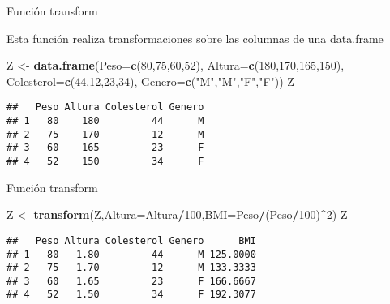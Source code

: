 \documentclass[ignorenonframetext,]{beamer}
\newenvironment{Shaded}{\begin{snugshade}}{\end{snugshade}}
\newcommand{\KeywordTok}[1]{\textcolor[rgb]{0.13,0.29,0.53}{\textbf{#1}}}
\newcommand{\DataTypeTok}[1]{\textcolor[rgb]{0.13,0.29,0.53}{#1}}
\newcommand{\DecValTok}[1]{\textcolor[rgb]{0.00,0.00,0.81}{#1}}
\newcommand{\StringTok}[1]{\textcolor[rgb]{0.31,0.60,0.02}{#1}}
\newcommand{\OperatorTok}[1]{\textcolor[rgb]{0.81,0.36,0.00}{\textbf{#1}}}
\newcommand{\NormalTok}[1]{#1}
\begin{document}
\begin{frame}[fragile]{Función transform}

Esta función realiza transformaciones sobre las columnas de una
data.frame

\begin{Shaded}
\begin{Highlighting}[]
\NormalTok{Z <-}\StringTok{ }\KeywordTok{data.frame}\NormalTok{(}\DataTypeTok{Peso=}\KeywordTok{c}\NormalTok{(}\DecValTok{80}\NormalTok{,}\DecValTok{75}\NormalTok{,}\DecValTok{60}\NormalTok{,}\DecValTok{52}\NormalTok{),}
                \DataTypeTok{Altura=}\KeywordTok{c}\NormalTok{(}\DecValTok{180}\NormalTok{,}\DecValTok{170}\NormalTok{,}\DecValTok{165}\NormalTok{,}\DecValTok{150}\NormalTok{),}
                \DataTypeTok{Colesterol=}\KeywordTok{c}\NormalTok{(}\DecValTok{44}\NormalTok{,}\DecValTok{12}\NormalTok{,}\DecValTok{23}\NormalTok{,}\DecValTok{34}\NormalTok{),}
                \DataTypeTok{Genero=}\KeywordTok{c}\NormalTok{(}\StringTok{"M"}\NormalTok{,}\StringTok{"M"}\NormalTok{,}\StringTok{"F"}\NormalTok{,}\StringTok{"F"}\NormalTok{))}
\NormalTok{Z}
\end{Highlighting}
\end{Shaded}

\begin{verbatim}
##   Peso Altura Colesterol Genero
## 1   80    180         44      M
## 2   75    170         12      M
## 3   60    165         23      F
## 4   52    150         34      F
\end{verbatim}

\end{frame}

\begin{frame}[fragile]{Función transform}

\begin{Shaded}
\begin{Highlighting}[]
\NormalTok{Z <-}\StringTok{ }\KeywordTok{transform}\NormalTok{(Z,}\DataTypeTok{Altura=}\NormalTok{Altura}\OperatorTok{/}\DecValTok{100}\NormalTok{,}\DataTypeTok{BMI=}\NormalTok{Peso}\OperatorTok{/}\NormalTok{(Peso}\OperatorTok{/}\DecValTok{100}\NormalTok{)}\OperatorTok{^}\DecValTok{2}\NormalTok{)}
\NormalTok{Z}
\end{Highlighting}
\end{Shaded}

\begin{verbatim}
##   Peso Altura Colesterol Genero      BMI
## 1   80   1.80         44      M 125.0000
## 2   75   1.70         12      M 133.3333
## 3   60   1.65         23      F 166.6667
## 4   52   1.50         34      F 192.3077
\end{verbatim}

\end{frame}
\end{document}
